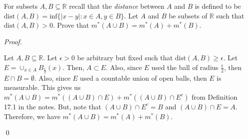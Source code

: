 \documentclass[12pt]{article}
\newenvironment{problem}[2][Problem]{\begin{trivlist}
\item[\hskip \labelsep {\bfseries #1}\hskip \labelsep {\bfseries
#2.}]}{\end{trivlist}}
\newenvironment{lemma}[2][Lemma]{\begin{trivlist}
\item[\hskip \labelsep {\bfseries #1}\hskip \labelsep {\bfseries #2.}]}{\end{trivlist}}
\newenvironment{sol}
    {\emph{Proof.}
    }
    {
    \qed
    }
\begin{document}
\begin{problem}{36}
For subsets $A,B \subseteq \mathbb{R}$ recall that the \textit{distance} between $A$ and $B$ is defined to be $\text{dist}(A,B) = \text{inf}\{ \left| x - y \right| : x \in A, y \in B \}$. Let $A$ and $B$ be subsets of $\mathbb{R}$ such that $\text{dist}(A,B) > 0$. Prove that $m^*(A \cup B) = m^*(A) + m^*(B)$. 
\end{problem}
\begin{sol}
Let $A,B \subseteq \mathbb{R}$. Let $\epsilon > 0$ be arbitrary but fixed such that $\text{dist}(A,B) \geq \epsilon$. Let $E = \cup_{x \in A}B_{\frac{\epsilon}{2}}(x)$. Then, $A \subset E$. Also, since $E$ used the ball of radius $\frac{\epsilon}{2}$, then $E \cap B = \emptyset$. Also, since $E$ used a countable union of open balls, then $E$ is measurable. This gives us $m^*(A \cup B) = m^*((A \cup B) \cap E) + m^*((A \cup B) \cap E^c)$ from Definition 17.1 in the notes. But, note that $(A \cup B) \cap E^c = B$ and $(A \cup B) \cap E = A$. Therefore, we have $m^*(A \cup B) = m^*(A) + m^*(B)$.
\end{sol}

    
    

\medskip




\end{document}
